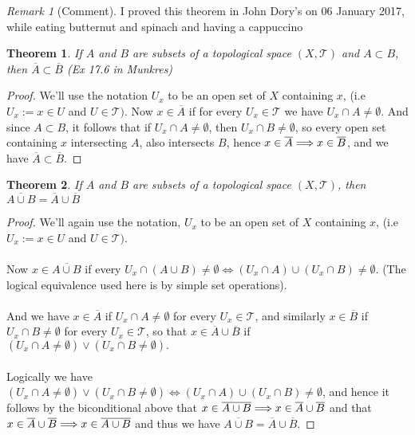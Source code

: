 \documentclass{article}
\newtheorem{theorem}{Theorem}[section]
\theoremstyle{remark}
\newtheorem*{remark}{Remark}
\theoremstyle{definition}
\newcommand{\simplies}{\DOTSB\Longrightarrow}
\begin{document}
\bigskip

\begin{remark}[Comment]
I proved this theorem in John Dory's on 06 January 2017, while eating butternut and spinach and having a cappuccino
\end{remark}
\bigskip
\begin{theorem}
If $A$ and $B$ are subsets of a topological space $(X, \mathcal{T})$ and $A \subset B$, then $\overline{A} \subset \overline{B}$ (Ex 17.6 in Munkres)
\end{theorem}

\begin{proof}
We'll use the notation $U_x$ to be an open set of $X$ containing $x$, (i.e $U_x := x \in U$ and $U \in \mathcal{T})$. Now $x \in \overline{A}$ if for every $U_x \in \mathcal{T}$ we have $U_x \cap A \neq \emptyset$. And since $A \subset B$, it follows that if $U_x \cap A \neq \emptyset$, then $U_x \cap B \neq \emptyset$, so every open set containing $x$ intersecting $A$, also intersects $B$, hence $x \in \overline{A} \simplies x \in \overline{B}$, and we have $\overline{A} \subset \overline{B}.$
\end{proof}

\bigskip

\begin{theorem}
If $A$ and $B$ are subsets of a topological space $(X, \mathcal{T})$, then $\overline{A \cup B} = \overline{A} \cup \overline{B}$
\end{theorem}

\begin{proof}
We'll again use the notation, $U_x$ to be an open set of $X$ containing $x$, (i.e $U_x := x \in U$ and $U \in \mathcal{T})$. \\ \\Now $x \in \overline{A \cup B}$ if every $U_x \cap (A \cup B) \neq \emptyset \iff (U_x \cap A) \cup (U_x \cap B) \neq \emptyset$. (The logical equivalence used here is by simple set operations).
\\ \\
And we have $x \in \overline{A}$ if $U_x \cap A \neq \emptyset$ for every $U_x \in \mathcal{T}$, and similarly  $x \in \overline{B}$ if $U_x \cap B \neq \emptyset$ for every $U_x \in \mathcal{T}$, so that $x \in \overline{A} \cup \overline{B}$ if $(U_x \cap A \neq \emptyset) \lor (U_x \cap B \neq \emptyset).$
\\ \\
Logically we have $(U_x \cap A \neq \emptyset) \lor (U_x \cap B \neq \emptyset) \iff (U_x \cap A) \cup (U_x \cap B) \neq \emptyset$, and hence it follows by the biconditional  above that $x \in \overline{A \cup B} \simplies  x \in \overline{A} \cup \overline{B}$ and that $x \in \overline{A} \cup \overline{B} \simplies x \in \overline{A \cup B}$ and thus we have $\overline{A \cup B} = \overline{A} \cup \overline{B}$.
\end{proof}
\end{document}

